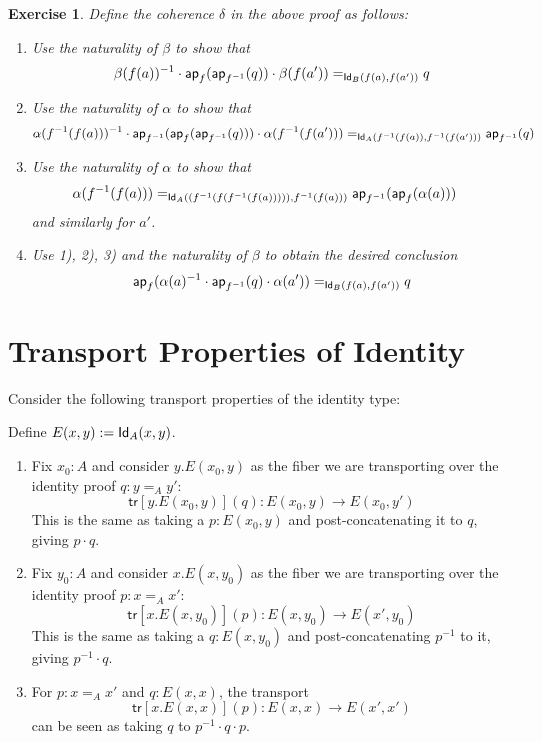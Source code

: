 \documentclass[12pt]{article}
\newcommand{\ap}{\mathsf{ap}}
\newcommand{\tr}{\mathsf{tr}}
\newtheorem*{exercise}{Exercise}
\begin{document}
\begin{exercise}
Define the coherence $\delta$ in the above proof as follows:
\begin{enumerate}
\item Use the naturality of $\beta$ to show that 
$$\beta(f(a))^{-1} \cdot \ap_f(\ap_{f^{-1}}(q)) \cdot \beta(f(a')) =_{\Id{B}(f(a),f(a'))} q$$
\item Use the naturality of $\alpha$ to show that 
$$\alpha(f^{-1}(f(a)))^{-1} \cdot \ap_{f^{-1}}(\ap_f(\ap_{f^{-1}}(q))) \cdot \alpha(f^{-1}(f(a'))) =_{\Id{A}(f^{-1}(f(a)),f^{-1}(f(a')))} \ap_{f^{-1}}(q)$$
\item Use the naturality of $\alpha$ to show that 
\begin{align*}
& \alpha(f^{-1}(f(a))) =_{\Id{A}((f^{-1}(f(f^{-1}(f(a))))), f^{-1}(f(a)))}  \ap_{f^{-1}}(\ap_f(\alpha(a)))
\end{align*}
and similarly for $a'$.
\item Use 1), 2), 3) and the naturality of $\beta$ to obtain the desired conclusion
$$\ap_f(\alpha(a)^{-1} \cdot \ap_{f^{-1}}(q) \cdot \alpha(a')) =_{\Id{B}(f(a),f(a'))} q$$
\end{enumerate}
\end{exercise}

\section{Transport Properties of Identity}\label{}

Consider the following transport properties of the identity type:

Define $E(x,y) := \mathsf{Id}_{A}(x,y)$.
\begin{enumerate}
\item Fix $x_0:A$ and consider $y.E(x_0,y)$ as the fiber we are transporting over
the identity proof $q:y=_Ay'$:
\[
\tr[y.E(x_0,y)](q):E(x_0,y)\to E(x_0,y')
\]
This is the same as taking a $p:E(x_0,y)$ and post-concatenating
it to $q$, giving $p \cdot q$.
\item Fix $y_0:A$ and consider $x.E(x,y_0)$ as the fiber we are transporting over
the identity proof $p:x=_Ax'$:
\[
\tr[x.E(x,y_0)](p):E(x,y_0)\to E(x',y_0)
\]
This is the same as taking a $q:E(x,y_0)$ and post-concatenating
$p^{-1}$ to it, giving $p^{-1} \cdot q$.
\item For $p:x=_Ax'$ and $q:E(x,x)$, the transport
\[
\tr[x.E(x,x)](p):E(x,x)\to E(x',x')
\]
can be seen as taking $q$ to $p^{-1}\cdot q\cdot p$.
\end{enumerate}
\end{document}
